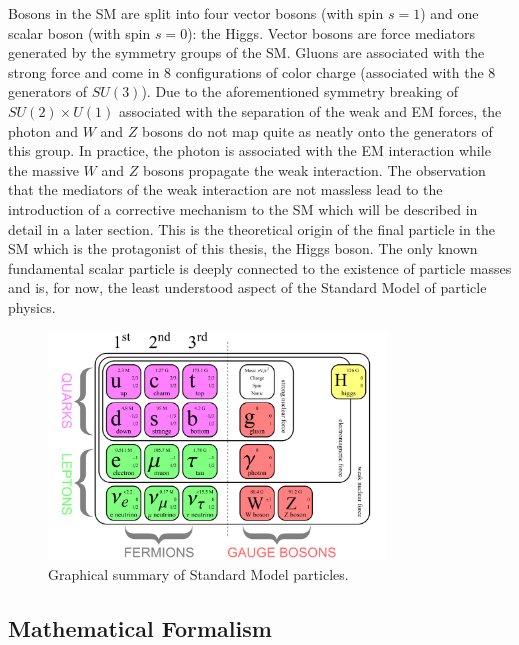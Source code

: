 Bosons in the SM are split into four vector bosons (with spin $s=1$) and one scalar boson (with spin $s=0$): 
the Higgs. Vector bosons are force mediators generated by the symmetry groups of the SM. Gluons are 
associated with the strong force and come in 8 configurations of color charge (associated with the 8 
generators of $SU(3)$). Due to the aforementioned symmetry breaking of $SU(2)\times U(1)$ associated with 
the separation of the weak and EM forces, the photon and $W$ and $Z$ bosons do not map quite as neatly 
onto the generators of this group. In practice, the photon is associated with the EM interaction while the massive 
$W$ and $Z$ bosons propagate the weak interaction. The observation that the mediators of the weak interaction 
are not massless lead to the introduction of a corrective mechanism to the SM which will be described in detail in 
a later section. This is the theoretical origin of the final particle in the SM which is the protagonist of this thesis, 
the Higgs boson. The only known fundamental scalar particle is deeply connected to the existence of particle 
masses and is, for now, the least understood aspect of the Standard Model of particle physics.

\begin{figure}
\centering
    \includegraphics[width=0.8\textwidth]{images/Standard_Model.png}
    \caption{Graphical summary of Standard Model particles.}
    \label{fig:Standard_Model}
\end{figure}

\subsection{Mathematical Formalism}


